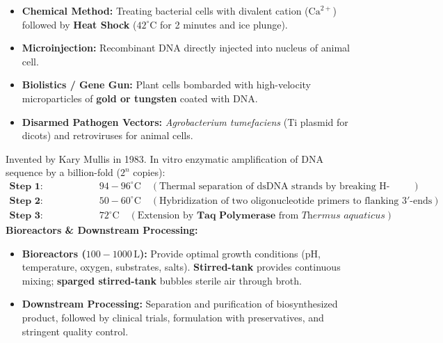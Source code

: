 \documentclass[10pt,a4paper]{article}
\begin{document}
\begin{conceptbox}
\begin{itemize}
  \item \textbf{Chemical Method:} Treating bacterial cells with divalent cation ($\mathrm{Ca}^{2+}$) followed by \textbf{Heat Shock} ($42^\circ\mathrm{C}$ for 2 minutes and ice plunge).
  \item \textbf{Microinjection:} Recombinant DNA directly injected into nucleus of animal cell.
  \item \textbf{Biolistics / Gene Gun:} Plant cells bombarded with high-velocity microparticles of \textbf{gold or tungsten} coated with DNA.
  \item \textbf{Disarmed Pathogen Vectors:} \textit{Agrobacterium tumefaciens} (Ti plasmid for dicots) and retroviruses for animal cells.
\end{itemize}
\end{conceptbox}

\begin{formulabox}
Invented by Kary Mullis in 1983. In vitro enzymatic amplification of DNA sequence by a billion-fold ($2^n$ copies):
\begin{align*}
  \textbf{Step 1: Denaturation: } & 94-96^\circ\mathrm{C} \quad (\text{Thermal separation of dsDNA strands by breaking H-bonds})\\
  \textbf{Step 2: Annealing: } & 50-60^\circ\mathrm{C} \quad (\text{Hybridization of two oligonucleotide primers to flanking } 3'\text{-ends})\\
  \textbf{Step 3: Extension: } & 72^\circ\mathrm{C} \quad (\text{Extension by } \mathbf{\text{Taq Polymerase}} \text{ from } \textit{Thermus aquaticus})
\end{align*}
\textbf{Bioreactors \& Downstream Processing:}
\begin{itemize}
  \item \textbf{Bioreactors ($100-1000\,\mathrm{L}$):} Provide optimal growth conditions (pH, temperature, oxygen, substrates, salts). \textbf{Stirred-tank} provides continuous mixing; \textbf{sparged stirred-tank} bubbles sterile air through broth.
  \item \textbf{Downstream Processing:} Separation and purification of biosynthesized product, followed by clinical trials, formulation with preservatives, and stringent quality control.
\end{itemize}
\end{formulabox}
\end{document}
